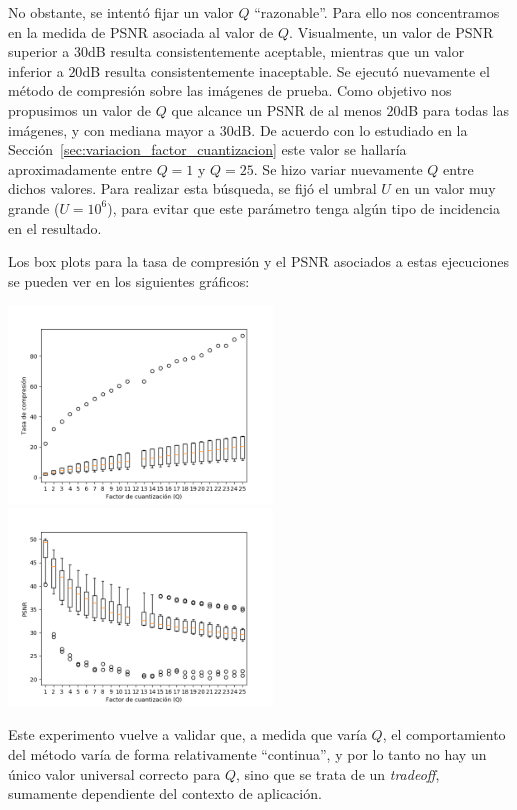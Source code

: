 \documentclass{article}
\begin{document}
No obstante, se intentó fijar un valor $Q$ ``razonable''.
Para ello nos concentramos en la medida de PSNR asociada al valor de $Q$.
Visualmente, un valor de PSNR superior a $30$dB resulta consistentemente aceptable,
mientras que un valor inferior a $20$dB resulta consistentemente inaceptable.
Se ejecutó nuevamente el método de compresión sobre las imágenes de prueba.
Como objetivo nos propusimos un valor de $Q$ que alcance un PSNR de al menos $20$dB
para todas las imágenes, y con mediana mayor a $30$dB.
De acuerdo con lo estudiado en la
Sección~\ref{sec:variacion_factor_cuantizacion}
este valor se hallaría aproximadamente entre $Q = 1$ y $Q = 25$.
Se hizo variar nuevamente $Q$ entre dichos valores.
Para realizar esta búsqueda, se fijó el umbral $U$ en un valor
muy grande ($U = 10^6$),
para evitar que este parámetro tenga algún tipo de incidencia en el resultado.

Los box plots para la tasa de compresión y el PSNR
asociados a estas ejecuciones se pueden ver en los siguientes gráficos:
\begin{center}
\includegraphics[width=7cm]{../imgs/output/gray_plots/qalt_rate.png}
\includegraphics[width=7cm]{../imgs/output/gray_plots/qalt_psnr.png}
\end{center}

Este experimento vuelve a validar que, a medida que varía $Q$,
el comportamiento del método varía de forma relativamente ``continua'',
y por lo tanto no hay un único valor universal correcto para $Q$,
sino que se trata de un {\em tradeoff}, sumamente dependiente del
contexto de aplicación.
\end{document}

